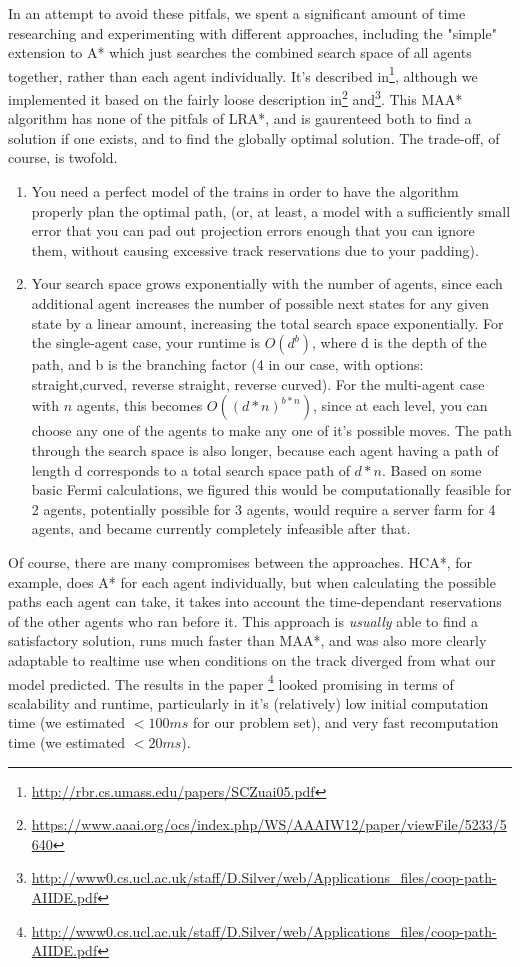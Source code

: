 \documentclass{article}
\begin{document}
In an attempt to avoid these pitfals, we spent a significant amount of time
researching and experimenting with different approaches, including the "simple"
extension to A* which just searches the combined search space of all agents
together, rather than each agent individually. It's described
in\footnote{\url{http://rbr.cs.umass.edu/papers/SCZuai05.pdf}}, although we
implemented it based on the fairly loose description
in\footnote{\url{https://www.aaai.org/ocs/index.php/WS/AAAIW12/paper/viewFile/5233/5640}}
and\footnote{\url{http://www0.cs.ucl.ac.uk/staff/D.Silver/web/Applications_files/coop-path-AIIDE.pdf}}. This MAA* algorithm has none of the pitfals of LRA*, and is
gaurenteed both to find a solution if one exists, and to find the globally
optimal solution. The trade-off, of course, is twofold.
\begin{enumerate}
\item You need a perfect model of the trains in order to have the algorithm
	properly plan the optimal path, (or, at least, a model with a sufficiently
	small error that you can pad out projection errors enough that you can
	ignore them, without causing excessive track reservations due to your
	padding).
\item Your search space grows exponentially with the number of agents, since
	each additional agent increases the number of possible next states for
	any given state by a linear amount, increasing the total search space
	exponentially. For the single-agent case, your runtime is $O(d^b)$,
	where d is the depth of the path, and b is the branching factor
	(4 in our case, with options: straight,curved, reverse straight,
	reverse curved). For the multi-agent case with $n$ agents, this becomes
	$O((d*n)^{b*n})$,
	since at each level, you can choose any one of the agents to make any one
	of it's possible moves. The path through the search space is also longer,
	because each agent having a path of length d corresponds to a total search
	space path of $d*n$. Based on some basic Fermi calculations, we figured
	this would be computationally feasible for 2 agents, potentially possible
	for 3 agents, would require a server farm for 4 agents, and became currently
	completely infeasible after that.
\end{enumerate}

Of course, there are many compromises between the approaches. HCA*, for
example, does A* for each agent individually, but when calculating the possible
paths each agent can take, it takes into account the time-dependant reservations
of the other agents who ran before it. This approach is \emph{usually} able to
find a satisfactory solution, runs much faster than MAA*, and was also more
clearly adaptable to realtime use when conditions on the track diverged from
what our model predicted. The results in the paper
\footnote{\url{http://www0.cs.ucl.ac.uk/staff/D.Silver/web/Applications_files/coop-path-AIIDE.pdf}}
looked promising in terms of scalability and runtime, particularly in it's
(relatively) low initial computation time (we estimated $<100ms$ for our problem
set), and very fast recomputation time (we estimated $<20ms$).
\end{document}
